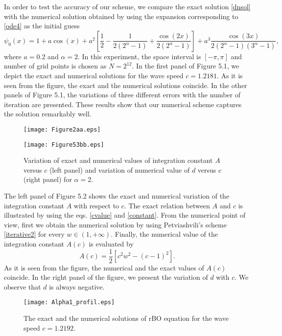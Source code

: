 \documentclass[12pt,reqno]{amsart}
\newcommand{\2}{L^2_{per}(0, T)}
\numberwithin{equation}{section}
\numberwithin{figure}{section}
\begin{document}
In order to test the accuracy of our scheme, we compare the exact solution \eqref{dnsol} with the numerical solution obtained by using  the expansion corresponding to \eqref{ode4} as the initial guess
\begin{equation} \label{initialguess}
 \psi_0(x)= 1+a\cos(x)+a^2\left[\frac{1}{2}-\frac{1}{2(2^{\alpha}-1)}+\frac{\cos(2x)}{2(2^{\alpha}-1)}\right]+a^3\frac{\cos(3x)}{2(2^{\alpha}-1)(3^{\alpha}-1)},  \end{equation}
where $a=0.2$ and $\alpha=2$.
 In this experiment, the space interval is $ [-\pi,\pi] $ and number of grid points is chosen as $N=2^{12}$. In the first panel of   Figure 5.1, we depict the exact and numerical solutions for the wave speed $c=1.2181$. As it is seen from the figure, the exact and the numerical solutions coincide. In the other panels of Figure 5.1, the variations of three different errors with the number of iteration are presented.  These results show that our numerical scheme captures the solution remarkably well.


 \vspace*{-10pt}
\begin{figure}[h]
\begin{minipage}[t]{0.49\linewidth}
   \texttt{[image: Figure2aa.eps]}
 \end{minipage}
  \begin{minipage}[t]{0.49\linewidth}
   \texttt{[image: Figure53bb.eps]}
 \end{minipage}
 \caption{Variation of exact and numerical values of  integration constant $A$ versus $c$ (left panel) and variation of numerical value of $d$ versus $c$ (right panel) for  $\alpha=2$.}
\end{figure}

\indent The left panel of Figure 5.2 shows the exact and numerical variation of the integration constant $A$ with respect to $c$. The exact relation between $A$ and $c$ is illustrated by using the eqs. \eqref{cvalue} and \eqref{constant}. From the numerical point of view, first we obtain the numerical solution by using  Petviashvili's scheme \eqref{iterative2} for every $w\in (1,+\infty)$. Finally,
the numerical value of the integration constant $A(c)$ is evaluated by
\begin{equation}\label{Avalue}
A(c)= \frac{1}{2} \left[ c^2 w^2-(c-1)^2 \right].
\end{equation}
 As it is seen from the figure, the numerical and the exact values of $A(c)$ coincide. In the right panel of the figure, we present the
variation of  $d$  with $c$. We observe that $d$ is always negative.
\begin{figure}[h]
 \centering
 \texttt{[image: Alpha1\_profil.eps]}
  \caption{The exact and the numerical solutions of rBO equation for the wave speed $c=1.2192$.}
\end{figure}
\end{document}
